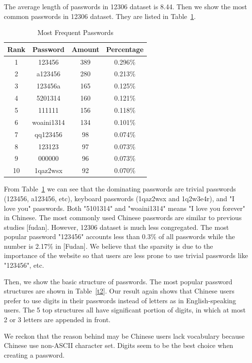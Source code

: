 \documentclass{sig-alternate}
\begin{document}
The average length of passwords in 12306 dataset is 8.44. Then we show the most common passwords in 12306 dataset. They are listed in Table~\ref{t1}.
\begin{table}
\centering
\caption{Most Frequent Passwords}
\begin{tabular}{|c|c|c|c|} \hline
Rank&Password&Amount&Percentage\\ \hline
1&123456&389&0.296\%\\ 
2&a123456&280&0.213\%\\ 
3&123456a&165&0.125\%\\ 
4&5201314&160&0.121\%\\ 
5&111111&156&0.118\%\\ 
6&woaini1314&134&0.101\%\\ 
7&qq123456&98&0.074\%\\ 
8&123123&97&0.073\%\\ 
9&000000&96&0.073\%\\ 
10&1qaz2wsx&92&0.070\%\\ 
\hline\end{tabular}
\label{t1}
\end{table}

From Table~\ref{t1} we can see that the dominating passwords are trivial passwords (123456, a123456, etc), keyboard passwords (1qaz2wsx and 1q2w3e4r), and "I love you" passwords. Both "5101314" and "woaini1314" means "I love you forever" in Chinese. The most commonly used Chinese passwords are similar to previous studies [fudan]. However, 12306 dataset is much less congregated. The most popular password "123456" accounts less than 0.3\% of all passwords while the number is 2.17\% in [Fudan]. We believe that the sparsity is due to the importance of the website so that users are less prone to use trivial passwords like "123456", etc. 

Then, we show the basic structure of passwords. The most popular password structures are shown in Table~\ref{t2}. Our result again shows that Chinese users prefer to use digits in their passwords instead of letters as in English-speaking users. The 5 top structures all have significant portion of digits, in which at most 2 or 3 letters are appended in front.

We reckon that the reason behind may be Chinese users lack vocabulary because Chinese use non-ASCII character set. Digits seem to be the best choice when creating a password.
\end{document}
